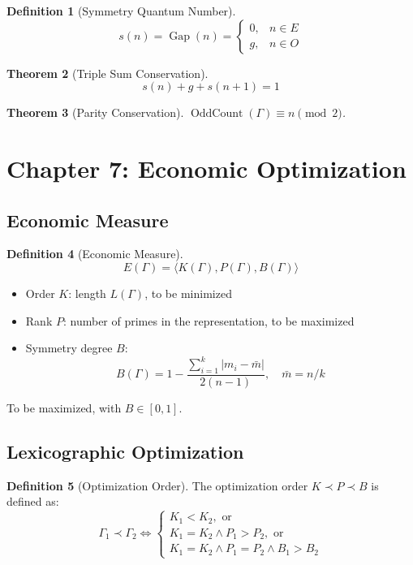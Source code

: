 \documentclass[12pt]{article}
\newtheorem{theorem}{Theorem}[section]
\theoremstyle{definition}
\newtheorem{definition}[theorem]{Definition}
\newcommand{\Gap}{\operatorname{Gap}}
\newcommand{\OddCount}{\operatorname{OddCount}}
\begin{document}
\begin{definition}[Symmetry Quantum Number]
\[
s(n) = \Gap(n) = \begin{cases}
0, & n \in E \\
g, & n \in O
\end{cases}
\]
\end{definition}

\begin{theorem}[Triple Sum Conservation]
\[
s(n) + g + s(n+1) = 1
\]
\end{theorem}

\begin{theorem}[Parity Conservation]
\(\OddCount(\Gamma) \equiv n \pmod{2}\).
\end{theorem}

\section{Chapter 7: Economic Optimization}

\subsection{Economic Measure}

\begin{definition}[Economic Measure]
\[
E(\Gamma) = \langle K(\Gamma), P(\Gamma), B(\Gamma) \rangle
\]
\begin{itemize}
    \item Order \(K\): length \(L(\Gamma)\), to be minimized
    \item Rank \(P\): number of primes in the representation, to be maximized
    \item Symmetry degree \(B\):
    \[
    B(\Gamma) = 1 - \frac{\sum_{i=1}^k |m_i - \bar{m}|}{2(n-1)},\quad \bar{m} = n/k
    \]
\end{itemize}
To be maximized, with \(B \in [0,1]\).
\end{definition}

\subsection{Lexicographic Optimization}

\begin{definition}[Optimization Order]
The optimization order \(K \prec P \prec B\) is defined as:
\[
\Gamma_1 \prec \Gamma_2 \iff
\begin{cases}
K_1 < K_2, \text{ or} \\
K_1 = K_2 \land P_1 > P_2, \text{ or} \\
K_1 = K_2 \land P_1 = P_2 \land B_1 > B_2
\end{cases}
\]
\end{definition}
\end{document}

